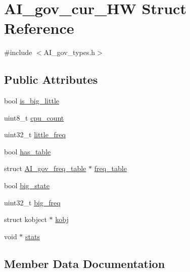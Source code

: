 \hypertarget{structAI__gov__cur__HW}{}\section{A\+I\+\_\+gov\+\_\+cur\+\_\+\+HW Struct Reference}
\label{structAI__gov__cur__HW}


{\ttfamily \#include $<$A\+I\+\_\+gov\+\_\+types.\+h$>$}

\subsection*{Public Attributes}
\begin{DoxyCompactItemize}
\item 
bool \hyperlink{structAI__gov__cur__HW_a457d24d037a060707431945f359e4193}{is\+\_\+big\+\_\+little}
\item 
uint8\+\_\+t \hyperlink{structAI__gov__cur__HW_a3a422f9944001793ba8c86b0c3ec655e}{cpu\+\_\+count}
\item 
uint32\+\_\+t \hyperlink{structAI__gov__cur__HW_a810c96a532f2f0caa1d73aca975424e1}{little\+\_\+freq}
\item 
bool \hyperlink{structAI__gov__cur__HW_a53332d6834a3cb51da9489907f3d5064}{has\+\_\+table}
\item 
struct \hyperlink{structAI__gov__freq__table}{A\+I\+\_\+gov\+\_\+freq\+\_\+table} $\ast$ \hyperlink{structAI__gov__cur__HW_a776f4cab734b48159920118a73970ee1}{freq\+\_\+table}
\item 
bool \hyperlink{structAI__gov__cur__HW_adeb5993b7a1a09dbc08d25a6d4f152ba}{big\+\_\+state}
\item 
uint32\+\_\+t \hyperlink{structAI__gov__cur__HW_a8e8fefd70951071a058e4dd42dcbbdcd}{big\+\_\+freq}
\item 
struct kobject $\ast$ \hyperlink{structAI__gov__cur__HW_abc6aa0ffa07d7a3120be7fa5ab251922}{kobj}
\item 
void $\ast$ \hyperlink{structAI__gov__cur__HW_ac0844e41c539599fcf5b85a5638f285f}{stats}
\end{DoxyCompactItemize}


\subsection{Member Data Documentation}
\mbox{\label{structAI__gov__cur__HW_a8e8fefd70951071a058e4dd42dcbbdcd}} 
